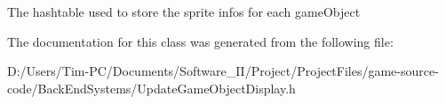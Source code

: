 The hashtable used to store the sprite infos for each game\+Object 

The documentation for this class was generated from the following file\+:\begin{DoxyCompactItemize}
\item 
D\+:/\+Users/\+Tim-\/\+P\+C/\+Documents/\+Software\+\_\+\+I\+I/\+Project/\+Project\+Files/game-\/source-\/code/\+Back\+End\+Systems/Update\+Game\+Object\+Display.\+h\end{DoxyCompactItemize}
